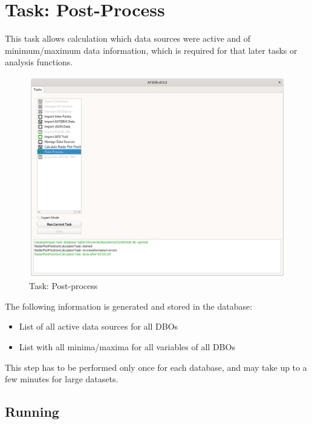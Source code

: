 \section{Task: Post-Process} 
\label{sec:task_postprocess}

This task allows calculation which data sources were active and of minimum/maximum data information, which is required for that later tasks or analysis functions.

\begin{figure}[H]
  \hspace*{-2.5cm}
    \includegraphics[width=19cm]{figures/db_postprocessing.png}
  \caption{Task: Post-process}
\end{figure}

The following information is generated and stored in the database:

\begin{itemize}  
\item List of all active data sources for all DBOs
\item List with all minima/maxima for all variables of all DBOs
\end{itemize}

This step has to be performed only once for each database, and may take up to a few minutes for large datasets. \\

\subsection{Running}

